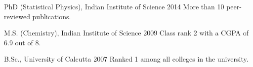 


\begin{cventries}


\eduentry
{} %
{PhD (Statistical Physics), Indian Institute of Science} %
{2014} %
{} %
{ %
More than 10 peer-reviewed publications.
}

\eduentry
{} %
{M.S. (Chemistry), Indian Institute of Science} %
{2009} %
{} %
{ %
Class rank 2 with a CGPA of 6.9 out of 8.
}

\eduentry
{} %
{B.Sc., University of Calcutta} %
{2007} %
{} %
{ %
Ranked 1 among all colleges in the university.
}


\end{cventries}
